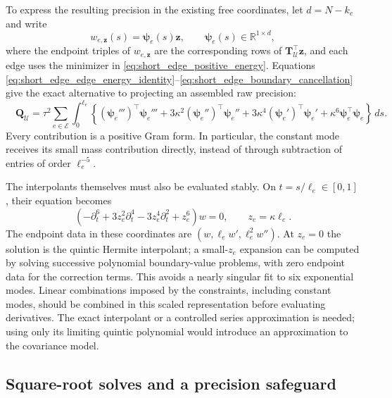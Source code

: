 \documentclass[11pt,a4paper]{article}
\theoremstyle{plain}
\theoremstyle{definition}
\begin{document}
To express the resulting precision in the existing free coordinates,
let $d=N-k_c$ and write
\begin{equation}
w_{e,\mathbf z}(s)=\boldsymbol\psi_e(s)\mathbf z,
\qquad \boldsymbol\psi_e(s)\in\mathbb R^{1\times d},
\end{equation}
where the endpoint triples of $w_{e,\mathbf z}$ are the corresponding
rows of $\mathbf T_{\mathcal U}^\top\mathbf z$, and each edge uses the
minimizer in \eqref{eq:short_edge_positive_energy}. Equations
\eqref{eq:short_edge_edge_energy_identity}--\eqref{eq:short_edge_boundary_cancellation}
give the exact alternative to projecting an assembled raw precision:
\begin{equation}
\boxed{\quad
\mathbf Q_{\mathcal U}
=\tau^2\sum_{e\in\mathcal E}\int_0^{\ell_e}
 \left\{
 (\boldsymbol\psi_e''')^\top\boldsymbol\psi_e'''
 +3\kappa^2(\boldsymbol\psi_e'')^\top\boldsymbol\psi_e''
 +3\kappa^4(\boldsymbol\psi_e')^\top\boldsymbol\psi_e'
 +\kappa^6\boldsymbol\psi_e^\top\boldsymbol\psi_e
 \right\}\,ds.
\quad}
\label{eq:short_edge_positive_graph_precision}
\end{equation}
Every contribution is a positive Gram form. In particular, the
constant mode receives its small mass contribution directly, instead
of through subtraction of entries of order $\ell_e^{-5}$.

The interpolants themselves must also be evaluated stably. On
$t=s/\ell_e\in[0,1]$, their equation becomes
\begin{equation}
\left(-\partial_t^6+3z_e^2\partial_t^4
            -3z_e^4\partial_t^2+z_e^6\right)w=0,
\qquad z_e=\kappa\ell_e.
\end{equation}
The endpoint data in these coordinates are
$(w,\ell_ew',\ell_e^2w'')$.
At $z_e=0$ the solution is the quintic Hermite interpolant; a
small-$z_e$ expansion can be computed by solving successive polynomial
boundary-value problems, with zero endpoint data for the correction
terms. This avoids a nearly singular fit to six exponential modes.
Linear combinations imposed by the constraints, including constant
modes, should be combined in this scaled representation before
evaluating derivatives. The exact interpolant or a controlled series
approximation is needed; using only its limiting quintic polynomial
would introduce an approximation to the covariance model.

\subsection{Square-root solves and a precision safeguard}
\end{document}
